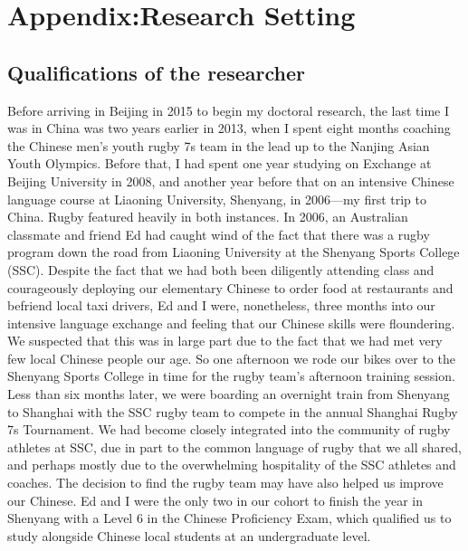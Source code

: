 \chapter{Appendix:Research Setting \label{app3:researchSetting}}

\begin{CJK}{UTF8}{gbsn}







  \section{Qualifications of the researcher\label{app3:qualPositionResearch}}

  Before arriving in Beijing in 2015 to begin my doctoral research, the last time I was in China was two years earlier in 2013, when I spent eight months coaching the Chinese men's youth rugby 7s team in the lead up to the Nanjing Asian Youth Olympics.  Before that, I had spent one year studying on Exchange at Beijing University in 2008, and another year before that on an intensive Chinese language course at Liaoning University, Shenyang, in 2006---my first trip to China.  Rugby featured heavily in both instances.  In 2006, an Australian classmate and friend Ed had caught wind of the fact that there was a rugby program down the road from Liaoning University at the Shenyang Sports College (SSC).  Despite the fact that we had both been diligently attending class and courageously deploying our elementary Chinese to order food at restaurants and befriend local taxi drivers, Ed and I were, nonetheless, three months into our intensive language exchange and feeling that our Chinese skills were floundering.  We suspected that this was in large part due to the fact that we had met very few local Chinese people our age.  So one afternoon we rode our bikes over to the Shenyang Sports College in time for the rugby team's afternoon training session.  Less than six months later, we were boarding an overnight train from Shenyang to Shanghai with the SSC rugby team to compete in the annual Shanghai Rugby 7s Tournament.  We had become closely integrated into the community of rugby athletes at SSC, due in part to the common language of rugby that we all shared, and perhaps mostly due to the overwhelming hospitality of the SSC athletes and coaches.  The decision to find the rugby team may have also helped us improve our Chinese. Ed and I were the only two in our cohort to finish the year in Shenyang with a Level 6 in the Chinese Proficiency Exam, which qualified us to study alongside Chinese local students at an undergraduate level.


\end{CJK}

